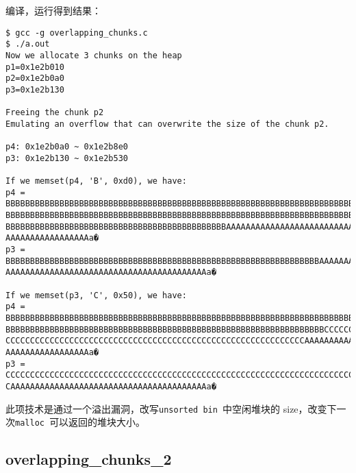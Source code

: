 编译，运行得到结果：
\begin{verbatim}
$ gcc -g overlapping_chunks.c
$ ./a.out 
Now we allocate 3 chunks on the heap
p1=0x1e2b010
p2=0x1e2b0a0
p3=0x1e2b130

Freeing the chunk p2
Emulating an overflow that can overwrite the size of the chunk p2.

p4: 0x1e2b0a0 ~ 0x1e2b8e0
p3: 0x1e2b130 ~ 0x1e2b530

If we memset(p4, 'B', 0xd0), we have:
p4 = BBBBBBBBBBBBBBBBBBBBBBBBBBBBBBBBBBBBBBBBBBBBBBBBBBBBBBBBBBBBBBBBBBBBBBBBBBBBBBB
BBBBBBBBBBBBBBBBBBBBBBBBBBBBBBBBBBBBBBBBBBBBBBBBBBBBBBBBBBBBBBBBBBBBBBBBBBBBBBBBBBBB
BBBBBBBBBBBBBBBBBBBBBBBBBBBBBBBBBBBBBBBBBBBBBAAAAAAAAAAAAAAAAAAAAAAAAAAAAAAAAAAAAAAA
AAAAAAAAAAAAAAAAAa�
p3 = BBBBBBBBBBBBBBBBBBBBBBBBBBBBBBBBBBBBBBBBBBBBBBBBBBBBBBBBBBBBBBBBAAAAAAAAAAAAAAA
AAAAAAAAAAAAAAAAAAAAAAAAAAAAAAAAAAAAAAAAAa�

If we memset(p3, 'C', 0x50), we have:
p4 = BBBBBBBBBBBBBBBBBBBBBBBBBBBBBBBBBBBBBBBBBBBBBBBBBBBBBBBBBBBBBBBBBBBBBBBBBBBBBBB
BBBBBBBBBBBBBBBBBBBBBBBBBBBBBBBBBBBBBBBBBBBBBBBBBBBBBBBBBBBBBBBBBCCCCCCCCCCCCCCCCCCC
CCCCCCCCCCCCCCCCCCCCCCCCCCCCCCCCCCCCCCCCCCCCCCCCCCCCCCCCCCCCCAAAAAAAAAAAAAAAAAAAAAAA
AAAAAAAAAAAAAAAAAa�
p3 = CCCCCCCCCCCCCCCCCCCCCCCCCCCCCCCCCCCCCCCCCCCCCCCCCCCCCCCCCCCCCCCCCCCCCCCCCCCCCCC
CAAAAAAAAAAAAAAAAAAAAAAAAAAAAAAAAAAAAAAAAa�
\end{verbatim}

此项技术是通过一个溢出漏洞，改写\verb+unsorted bin +中空闲堆块的 size，改变下一次\verb+malloc +可以返回的堆块大小。

\subsection{overlapping\_chunks\_2}

